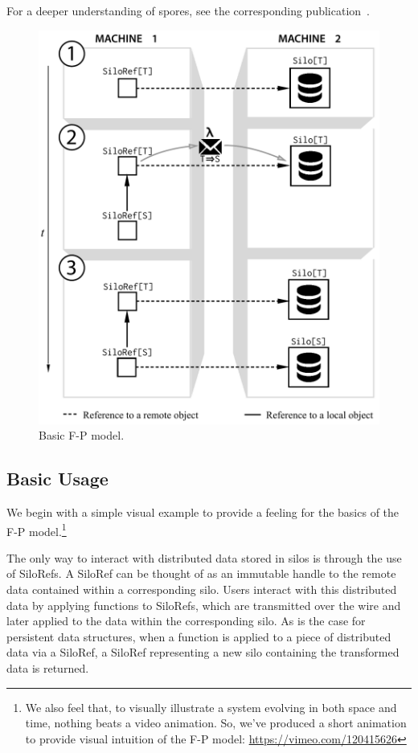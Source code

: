 \documentclass[preprint]{sigplanconf}
\theoremstyle{definition}
\theoremstyle{definition}
\begin{document}
For a deeper understanding of spores, see
the corresponding publication~\cite{Spores}.

\begin{figure}[t!]
\centering\includegraphics[width=0.8\columnwidth]{basic-diagram.pdf}
\caption{Basic F-P model.}\label{fig:basic-diagram}
\end{figure}

\subsection{Basic Usage}

We begin with a simple visual example to provide a feeling for the basics of the F-P
model.\footnote{We also feel that, to visually illustrate a system evolving in
both space and time, nothing beats a video animation. So, we've produced a
short animation to provide visual intuition of the F-P model:
\url{https://vimeo.com/120415626}}

The only way to interact with distributed data stored in silos is through the
use of SiloRefs. A SiloRef can be thought of as an immutable handle to the
remote data contained within a corresponding silo. Users interact with this
distributed data by applying functions to SiloRefs, which are transmitted over
the wire and later applied to the data within the corresponding silo. As is
the case for persistent data structures, when a function is applied to a piece
of distributed data via a SiloRef, a SiloRef representing a new silo
containing the transformed data is returned.
\end{document}
